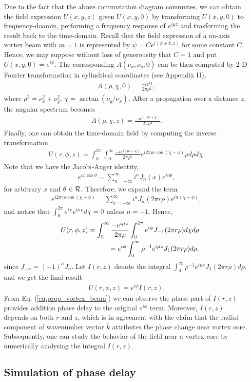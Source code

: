 Due to the fact that the above commutation diagram commutes, we can obtain the field expression $U(x, y, z)$ given $U(x, y, 0)$ by transforming $U(x, y, 0)$ to frequency-doamin, performing a frequency response of $e^{i \mu z}$ and trasforming the result back to the time-domain. Recall that the field expression of a on-axis vortex beam with $m = 1$ is represented by $\psi = Ce^{i (\phi + k_z z)}$ for some constant $C$. Hence, we may suppose without loss of generousity that $C = 1$ and put $U(x, y, 0) = e^{i\phi}$. The corresponding $A(\nu_x, \nu_y, 0)$ can be then computed by 2-D Fourier transformation in cylindrical coordinates (see Appendix II),
\begin{eqnarray}
	A(\rho, \chi, 0) = \frac{-i e^{i\chi}}{2\pi \rho^2},
\end{eqnarray}
where $\rho^2 = \nu_x^2 + \nu_y^2$, $ \chi = \arctan(\nu_y/\nu_x)$. After a propagation over a distance $z$, the angular spectrum becomes
\begin{eqnarray}
	A(\rho, \chi, z) = \frac{-i e^{i(\mu z + \chi)}}{2\pi \rho^2}.
\end{eqnarray}
Finally, one can obtain the time-domain field by computing the inverse transformation
\begin{eqnarray}
	U(r, \phi, z) =  \int_{0}^{2\pi} \int_{0}^{\infty} \frac{-i e^{i(\mu z + \chi)}}{2\pi \rho^2}e^{i 2\pi \rho r \cos(\chi - \phi)} \rho d\rho d\chi.
	\nonumber
\end{eqnarray}
Note that we have the Jacobi-Anger identity,
\begin{eqnarray}
	e^{ix\cos\theta} = \sum_{n = -\infty}^{\infty} i^n J_{n}(x) e^{i n \theta},
\end{eqnarray}
for arbitrary $x$ and  $\theta \in {\cal R}$. Therefore, we expand the term
\begin{eqnarray}
	e^{i 2 \pi r \rho \cos(\chi - \phi)} = 
	\sum_{n = -\infty}^{\infty} i^{n} J_n(2 \pi r \rho) e^{i n (\chi - \phi)},
	\nonumber
\end{eqnarray}
and notice that $ \int_{0}^{2\pi} e^{i \chi} e^{i n \chi} d\chi = 0$ unless $n = -1$. Hence,
\begin{eqnarray}
	&&U(r, \phi, z) = \int_{0}^{\infty} \frac{- e^{i \mu z}}{2 \pi \rho} \int_{0}^{2\pi} e^{i\phi} J_{-1}(2 \pi r \rho) d\chi d\rho
	\nonumber\\
	&& \hspace{0.5in} = e^{i \phi} \int_{0}^{\infty} \rho^{-1} e^{i \mu z} J_1(2 \pi r \rho) d\rho,
\end{eqnarray}
since $J_{-n} = (-1)^n J_{n}$. Let $I(r, z)$ denote the integral $\int_{0}^{\infty} \rho^{-1} e^{i \mu z} J_1 (2 \pi r \rho) d\rho$, and we get the final result
\begin{eqnarray}
	U(r, \phi, z) = e^{i\phi} I(r, z).
	\label{eq:prop_vortex_beam}
\end{eqnarray}
From Eq. (\ref{eq:prop_vortex_beam}) we can observe the phase part of $I(r, z)$ provides addition phase delay to the original $e^{i \phi}$ term. Moreover, $I(r, z)$ depends on both $r$ and $z$, which is in agreement with the claim that the radial component of wavenumber vector $\bar{k}$ attributes the phase change near vortex core. Subsequently, one can study the behavior of the field near a vortex core by numerically analysing the integral $I(r, z)$.
\subsection{Simulation of phase delay}